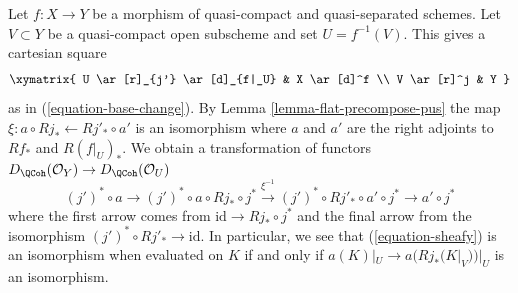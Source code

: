 \noindent
Let $f : X \to Y$ be a morphism of quasi-compact and quasi-separated
schemes. Let $V \subset Y$ be a quasi-compact open subscheme and set
$U = f^{-1}(V)$. This gives a cartesian square
$$
\xymatrix{
U \ar[r]_{j'} \ar[d]_{f|_U} & X \ar[d]^f \\
V \ar[r]^j & Y
}
$$
as in (\ref{equation-base-change}). By Lemma \ref{lemma-flat-precompose-pus}
the map $\xi : a \circ Rj_* \leftarrow Rj'_* \circ a'$ is an isomorphism
where $a$ and $a'$ are the right adjoints to
$Rf_*$ and $R(f|_U)_*$. We obtain a transformation
of functors $D_\QCoh(\mathcal{O}_Y) \to D_\QCoh(\mathcal{O}_U)$
\begin{equation}
\label{equation-sheafy}
(j')^* \circ a \to
(j')^* \circ a \circ Rj_* \circ j^* \xrightarrow{\xi^{-1}}
(j')^* \circ Rj'_* \circ a' \circ j^* \to a' \circ j^*
\end{equation}
where the first arrow comes from $\text{id} \to Rj_* \circ j^*$
and the final arrow from the isomorphism $(j')^* \circ Rj'_* \to \text{id}$.
In particular, we see that (\ref{equation-sheafy}) is an isomorphism
when evaluated on $K$ if and only if $a(K)|_U \to a(Rj_*(K|_V))|_U$
is an isomorphism.